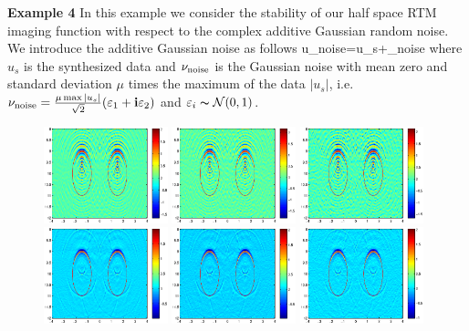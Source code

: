 \documentclass[12pt]{iopart}
\begin{document}
\bigskip
\textbf{Example 4}
In this example we consider the stability of our half space RTM imaging
function with respect to the complex additive Gaussian random noise. We introduce
the additive Gaussian noise as follows
\ben
u_{\rm noise}=u_s+\nu_{\rm noise}
\een
where $u_s$ is the synthesized data and $\nu_{\rm noise}$ is the Gaussian noise with mean zero and standard deviation $\mu$ times the maximum of  the data $|u_s|$, i.e. $\nu_{\rm noise}=\frac{\mu \max |u_s|}{\sqrt{2}}(\varepsilon_1+\mathbf{i}\varepsilon_2)$ and  $\varepsilon_i
\thicksim \mathcal{N}(0,1)$.
\begin{figure}
	\centering
	\includegraphics[width=0.32\textwidth]{./graphic/bi_circle_4pi_error2.eps}
	\includegraphics[width=0.32\textwidth]{./graphic/bi_circle_4pi_error4.eps}
	\includegraphics[width=0.32\textwidth]{./graphic/bi_circle_4pi_error6.eps}
	\includegraphics[width=0.32\textwidth]{./graphic/bi_circle_multi_2_8_error2.eps}
	\includegraphics[width=0.32\textwidth]{./graphic/bi_circle_multi_2_8_error4.eps}
	\includegraphics[width=0.32\textwidth]{./graphic/bi_circle_multi_2_8_error6.eps}
	

\end{figure}
\end{document}

